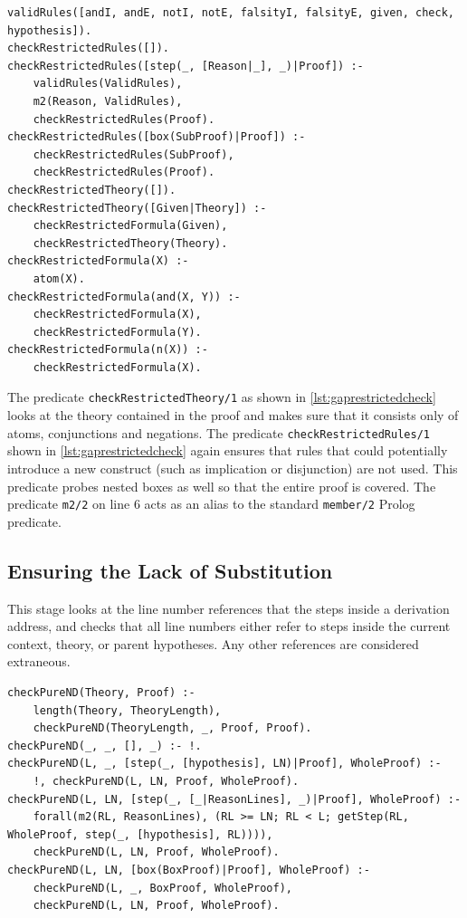 \documentclass[11pt,twoside,a4paper]{report}
\begin{document}
\begin{lstlisting}[caption={Checking whether a proof uses only conjunction and negation},label=lst:gaprestrictedcheck]
% Checks to see if the proof consists of ruleset defined over argumentation logic
validRules([andI, andE, notI, notE, falsityI, falsityE, given, check, hypothesis]).
checkRestrictedRules([]).
checkRestrictedRules([step(_, [Reason|_], _)|Proof]) :- 
	validRules(ValidRules), 
	m2(Reason, ValidRules), 
	checkRestrictedRules(Proof).
checkRestrictedRules([box(SubProof)|Proof]) :-
	checkRestrictedRules(SubProof),
	checkRestrictedRules(Proof).
checkRestrictedTheory([]).
checkRestrictedTheory([Given|Theory]) :-
	checkRestrictedFormula(Given),
	checkRestrictedTheory(Theory).
checkRestrictedFormula(X) :- 
	atom(X).
checkRestrictedFormula(and(X, Y)) :-
	checkRestrictedFormula(X),
	checkRestrictedFormula(Y).
checkRestrictedFormula(n(X)) :-
	checkRestrictedFormula(X).
\end{lstlisting}

The predicate \lstinline$checkRestrictedTheory/1$ as shown in \autoref{lst:gaprestrictedcheck} looks at the theory contained in the proof and makes sure that it consists only of atoms, conjunctions and negations. The predicate \lstinline$checkRestrictedRules/1$ shown in \autoref{lst:gaprestrictedcheck} again ensures that rules that could potentially introduce a new construct (such as implication or disjunction) are not used. This predicate probes nested boxes as well so that the entire proof is covered. The predicate \lstinline$m2/2$ on line 6 acts as an alias to the standard \lstinline$member/2$ Prolog predicate.

\subsection{Ensuring the Lack of Substitution}
This stage looks at the line number references that the steps inside a derivation address, and checks that all line numbers either refer to steps inside the current context, theory, or parent hypotheses. Any other references are considered extraneous.

\begin{lstlisting}[caption={Checking whether a proof uses any shortcuts},label=lst:gapsubcheck]
% Checks to see if this proof does not make references to external derivations
checkPureND(Theory, Proof) :-
	length(Theory, TheoryLength),
	checkPureND(TheoryLength, _, Proof, Proof).
checkPureND(_, _, [], _) :- !.
checkPureND(L, _, [step(_, [hypothesis], LN)|Proof], WholeProof) :-
	!, checkPureND(L, LN, Proof, WholeProof).
checkPureND(L, LN, [step(_, [_|ReasonLines], _)|Proof], WholeProof) :-
	forall(m2(RL, ReasonLines), (RL >= LN; RL < L; getStep(RL, WholeProof, step(_, [hypothesis], RL)))),
	checkPureND(L, LN, Proof, WholeProof).
checkPureND(L, LN, [box(BoxProof)|Proof], WholeProof) :-
	checkPureND(L, _, BoxProof, WholeProof),
	checkPureND(L, LN, Proof, WholeProof).
\end{lstlisting}
\end{document}
